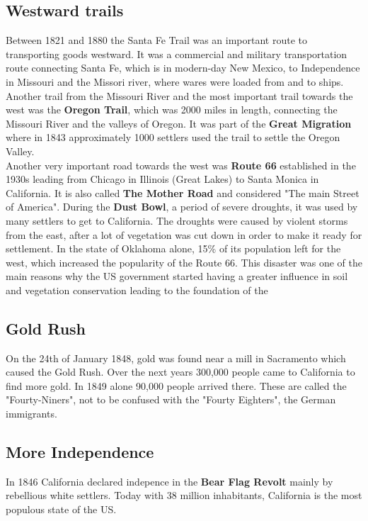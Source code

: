 \documentclass{article}
\begin{document}
	\subsection{Westward trails}
	Between 1821 and 1880 the Santa Fe Trail was an important route to transporting goods westward. It was a commercial and military transportation route connecting Santa Fe, which is in modern-day New Mexico, to Independence in Missouri and the Missori river, where wares were loaded from and to ships.\\
	Another trail from the Missouri River and the most important trail towards the west was the \textbf{Oregon Trail}, which was 2000 miles in length, connecting the Missouri River and the valleys of Oregon. It was part of the \textbf{Great Migration} where in 1843 approximately 1000 settlers used the trail to settle the Oregon Valley. \\
	Another very important road towards the west was \textbf{Route 66} established in the 1930s leading from Chicago in Illinois (Great Lakes) to Santa Monica in California. It is also called \textbf{The Mother Road} and considered "The main Street of America". During the \textbf{Dust Bowl}, a period of severe droughts, it was used by many settlers to get to California. The droughts were caused by violent storms from the east, after a lot of vegetation was cut down in order to make it ready for settlement. In the state of Oklahoma alone, 15\% of its population left for the west, which increased the popularity of the Route 66. This disaster was one of the main reasons why the US government started having a greater influence in soil and vegetation conservation leading to the foundation of the \\
	\subsection{Gold Rush}
	On the 24th of January 1848, gold was found near a mill in Sacramento which caused the Gold Rush. Over the next years 300,000 people came to California to find more gold. In 1849 alone 90,000 people arrived there. These are called the "Fourty-Niners", not to be confused with the "Fourty Eighters", the German immigrants. \\
	\subsection{More Independence}
	In 1846 California declared indepence in the \textbf{Bear Flag Revolt} mainly by rebellious white settlers. Today with 38 million inhabitants, California is the most populous state of the US. \\
\end{document}
